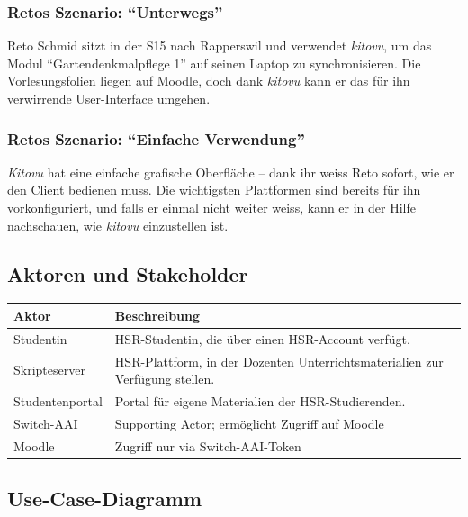 \documentclass[a4paper]{article}
\begin{document}
\subsubsection{Retos Szenario: ``Unterwegs''}

Reto Schmid sitzt in der S15 nach Rapperswil und verwendet \emph{kitovu}, um das Modul ``Gartendenkmalpflege 1'' auf seinen Laptop zu synchronisieren. Die Vorlesungsfolien liegen auf Moodle, doch dank \emph{kitovu} kann er das für ihn verwirrende User-Interface umgehen.

\subsubsection{Retos Szenario: ``Einfache Verwendung''}

\emph{Kitovu} hat eine einfache grafische Oberfläche -- dank ihr weiss Reto sofort, wie er den Client bedienen muss. Die wichtigsten Plattformen sind bereits für ihn vorkonfiguriert, und falls er einmal nicht weiter weiss, kann er in der Hilfe nachschauen, wie \emph{kitovu} einzustellen ist.

\pagebreak
\subsection{Aktoren und Stakeholder}

\begin{tabulary}{\linewidth}{lL}
	\toprule
	Aktor & Beschreibung\\
	\midrule
	Studentin & HSR-Studentin, die über einen HSR-Account verfügt.\\
	Skripteserver & HSR-Plattform, in der Dozenten Unterrichtsmaterialien zur Verfügung stellen.\\
	Studentenportal & Portal für eigene Materialien der HSR-Studierenden.\\
	Switch-AAI & Supporting Actor; ermöglicht Zugriff auf Moodle \\	
	Moodle & Zugriff nur via Switch-AAI-Token\\
	
	\bottomrule
\end{tabulary}

\subsection{Use-Case-Diagramm}
\end{document}
